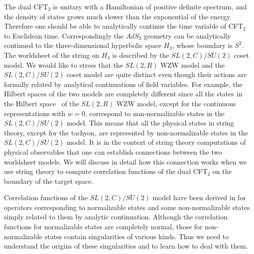 The dual CFT$_2$ is unitary with a Hamiltonian
of positive definite spectrum, and the density of
states grows much slower than the exponential
of the energy.
Therefore one should be able to
analytically continue the time variable of CFT$_2$
to Euclidean time. Correspondingly the $AdS_3$ geometry
can be analytically continued to the three-dimensional
hyperbolic space $H_3$, whose boundary is $S^2$.
The worldsheet of the string on $H_3$ is described by
the $SL(2,C)/SU(2)$ coset model. We would like to stress
that the $SL(2,R)$ WZW model and the $SL(2,C)/SU(2)$
coset model are quite distinct even though their  actions
are formally related by analytical continuations of
field variables. For example,
the Hilbert spaces of the two models are completely
different since all the
states in the Hilbert space \hilbertspace\
of the $SL(2,R)$ WZW model, except for the continuous representations
with $w=0$, correspond to non-normalizable
states in the $SL(2,C)/SU(2)$ model. This means that
all the physical states in string theory, except for
the tachyon, are represented
by non-normalizable states in the $SL(2,C)/SU(2)$ model.
It is in the context of string theory computations of
physical observables
that one can establish connections between the
two worldsheet models.
We will discuss in detail how this connection
works when we use string theory to compute correlation
functions of the dual CFT$_2$ on the boundary of the
target space.

Correlation functions of the $SL(2,C)/SU(2)$ model have
been derived in 
for operators corresponding to normalizable states and
some non-normalizable states simply related to them by analytic
continuation.
Although the
correlation functions for normalizable states are completely
normal, those for non-normalizable states  contain singularities
of various kinds. Thus we need to understand the origins of these
singularities and to learn how to deal with them.

